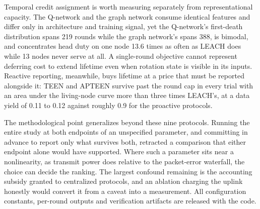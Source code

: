 Temporal credit assignment is worth measuring separately from representational
capacity. The Q-network and the graph network consume identical features and
differ only in architecture and training signal, yet the Q-network's first-death
distribution spans 219 rounds while the graph network's spans 388, is bimodal,
and concentrates head duty on one node 13.6 times as often as LEACH does while
13 nodes never serve at all. A single-round objective cannot represent deferring
cost to extend lifetime even when rotation state is visible in its inputs.
Reactive reporting, meanwhile, buys lifetime at a price that must be reported
alongside it: TEEN and APTEEN survive past the round cap in every trial with an
area under the living-node curve more than three times LEACH's, at a data yield
of 0.11 to 0.12 against roughly 0.9 for the proactive protocols.

The methodological point generalizes beyond these nine protocols. Running the
entire study at both endpoints of an unspecified parameter, and committing in
advance to report only what survives both, retracted a comparison that either
endpoint alone would have supported. Where such a parameter sits near a
nonlinearity, as transmit power does relative to the packet-error waterfall, the
choice can decide the ranking. The largest confound remaining is the accounting
subsidy granted to centralized protocols, and an ablation charging the uplink
honestly would convert it from a caveat into a measurement. All configuration
constants, per-round outputs and verification artifacts are released with the
code.
